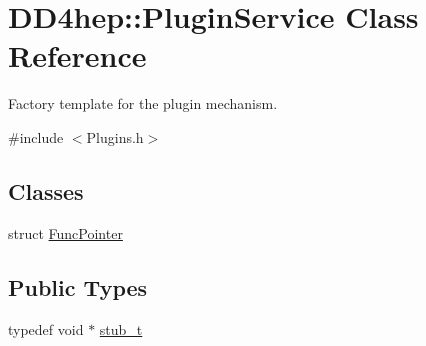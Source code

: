 \hypertarget{class_d_d4hep_1_1_plugin_service}{}\section{D\+D4hep\+:\+:Plugin\+Service Class Reference}
\label{class_d_d4hep_1_1_plugin_service}


Factory template for the plugin mechanism.  




{\ttfamily \#include $<$Plugins.\+h$>$}

\subsection*{Classes}
\begin{DoxyCompactItemize}
\item 
struct \hyperlink{struct_d_d4hep_1_1_plugin_service_1_1_func_pointer}{Func\+Pointer}
\end{DoxyCompactItemize}
\subsection*{Public Types}
\begin{DoxyCompactItemize}
\item 
typedef void $\ast$ \hyperlink{class_d_d4hep_1_1_plugin_service_aa370cd45b770eaabf326eeaa91019382}{stub\+\_\+t}
\end{DoxyCompactItemize}
